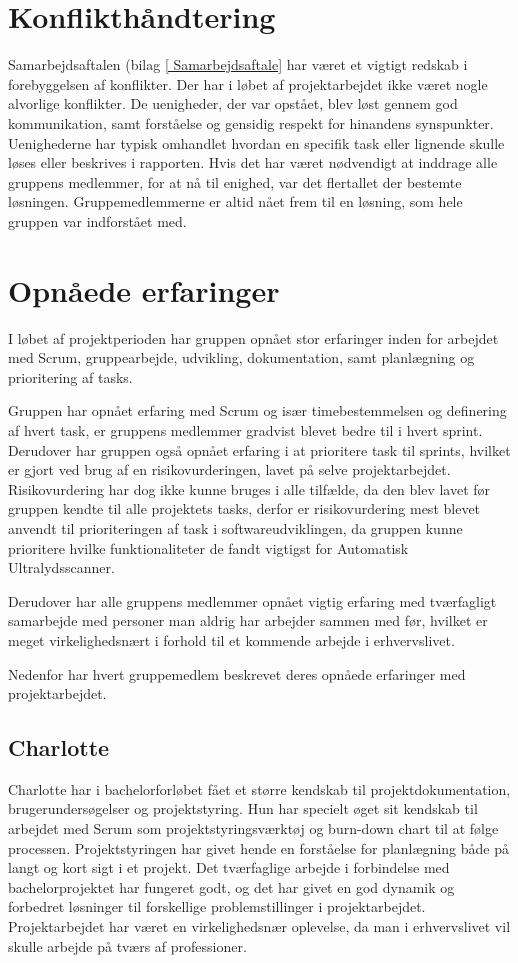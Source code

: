 \section{Konflikthåndtering}
Samarbejdsaftalen (bilag \ref{ Samarbejdsaftale} har været et vigtigt redskab i forebyggelsen af konflikter. Der har i løbet af projektarbejdet ikke været nogle alvorlige konflikter.  De uenigheder, der var opstået, blev løst gennem god kommunikation, samt forståelse og gensidig respekt for hinandens synspunkter. Uenighederne har typisk omhandlet hvordan en specifik task eller lignende skulle løses eller beskrives i rapporten. Hvis det har været nødvendigt at inddrage alle gruppens medlemmer, for at nå til enighed, var det flertallet der bestemte løsningen. Gruppemedlemmerne er altid nået frem til en løsning, som hele gruppen var indforstået med.

\section{Opnåede erfaringer}
I løbet af projektperioden har gruppen opnået stor erfaringer inden for arbejdet med Scrum, gruppearbejde, udvikling, dokumentation, samt planlægning og prioritering af tasks. 

Gruppen har opnået erfaring med Scrum og især timebestemmelsen og definering af hvert task, er gruppens medlemmer gradvist blevet bedre til i hvert sprint. Derudover har gruppen også opnået erfaring i at prioritere task til sprints, hvilket er gjort ved brug af en risikovurderingen, lavet på selve projektarbejdet. Risikovurdering har dog ikke kunne bruges i alle tilfælde, da den blev lavet før gruppen kendte til alle projektets tasks, derfor er risikovurdering mest blevet anvendt til prioriteringen af task i softwareudviklingen, da gruppen kunne prioritere hvilke funktionaliteter de fandt vigtigst for Automatisk Ultralydsscanner. 

Derudover har alle gruppens medlemmer opnået vigtig erfaring med tværfagligt samarbejde med personer man aldrig har arbejder sammen med før, hvilket er meget virkelighedsnært i forhold til et kommende arbejde i erhvervslivet.

Nedenfor har hvert gruppemedlem beskrevet deres opnåede erfaringer med projektarbejdet. 

\subsection{Charlotte}
Charlotte har i bachelorforløbet fået et større kendskab til projektdokumentation, brugerundersøgelser og projektstyring. Hun har specielt øget sit kendskab til arbejdet med Scrum som projektstyringsværktøj og burn-down chart til at følge processen. Projektstyringen har givet hende en forståelse for planlægning både på langt og kort sigt i et projekt. Det tværfaglige arbejde i forbindelse med bachelorprojektet har fungeret godt, og det har givet en god dynamik og forbedret løsninger til forskellige problemstillinger i projektarbejdet. Projektarbejdet har været en virkelighedsnær oplevelse, da man i erhvervslivet vil skulle arbejde på tværs af professioner. 

